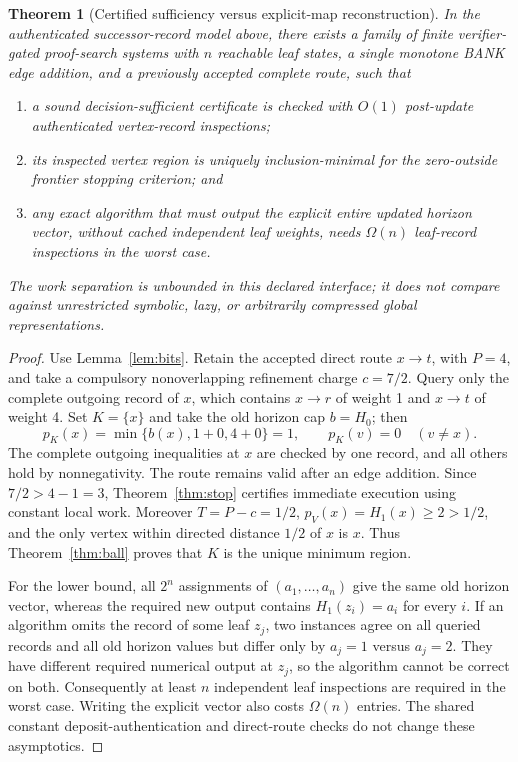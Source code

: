 \documentclass[11pt,letterpaper]{article}
\newtheorem{theorem}{Theorem}[section]
\theoremstyle{definition}
\theoremstyle{remark}
\begin{document}
\begin{theorem}[Certified sufficiency versus explicit-map reconstruction]\label{thm:separation}
In the authenticated successor-record model above, there exists a family of finite verifier-gated proof-search systems with \(n\) reachable leaf states, a single monotone BANK edge addition, and a previously accepted complete route, such that
\begin{enumerate}[label=(\alph*)]
\item a sound \emph{decision-sufficient} certificate is checked with \(O(1)\) post-update authenticated vertex-record inspections;
\item its inspected vertex region is uniquely inclusion-minimal for the zero-outside frontier stopping criterion; and
\item any exact algorithm that must output the \emph{explicit entire updated horizon vector}, without cached independent leaf weights, needs \(\Omega(n)\) leaf-record inspections in the worst case.
\end{enumerate}
The work separation is unbounded in this declared interface; it does \emph{not} compare against unrestricted symbolic, lazy, or arbitrarily compressed global representations.
\end{theorem}
\begin{proof}
Use Lemma~\ref{lem:bits}. Retain the accepted direct route \(x\to t\), with \(P=4\), and take a compulsory nonoverlapping refinement charge \(c=7/2\). Query only the complete outgoing record of \(x\), which contains \(x\to r\) of weight 1 and \(x\to t\) of weight 4. Set \(K=\{x\}\) and take the old horizon cap \(b=H_0\); then
\[
p_K(x)=\min\{b(x),1+0,4+0\}=1,\qquad p_K(v)=0\quad(v\ne x).
\]
The complete outgoing inequalities at \(x\) are checked by one record, and all others hold by nonnegativity. The route remains valid after an edge addition. Since \(7/2>4-1=3\), Theorem~\ref{thm:stop} certifies immediate execution using constant local work. Moreover \(T=P-c=1/2\), \(p_V(x)=H_1(x)\ge2>1/2\), and the only vertex within directed distance \(1/2\) of \(x\) is \(x\). Thus Theorem~\ref{thm:ball} proves that \(K\) is the unique minimum region.

For the lower bound, all \(2^n\) assignments of \((a_1,\ldots,a_n)\) give the same old horizon vector, whereas the required new output contains \(H_1(z_i)=a_i\) for every \(i\). If an algorithm omits the record of some leaf \(z_j\), two instances agree on all queried records and all old horizon values but differ only by \(a_j=1\) versus \(a_j=2\). They have different required numerical output at \(z_j\), so the algorithm cannot be correct on both. Consequently at least \(n\) independent leaf inspections are required in the worst case. Writing the explicit vector also costs \(\Omega(n)\) entries. The shared constant deposit-authentication and direct-route checks do not change these asymptotics.
\end{proof}
\end{document}
